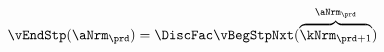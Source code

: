   \begin{equation}\begin{gathered}\begin{aligned}
        \vEndStp(\aNrm_{\prd}) & = \DiscFac \vBegStpNxt(\overbrace{\kNrm_{\prd+1}}^{\aNrm_{\prd}}) \label{eq:vEndtdefn}
      \end{aligned}\end{gathered}\end{equation}
